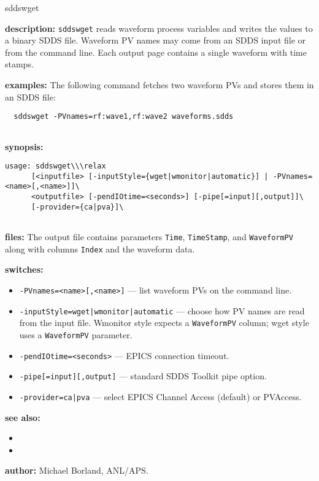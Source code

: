 \begin{sddsprog}{sddswget}
\item \textbf{description:}
  \verb+sddswget+ reads waveform process variables and writes the values to a binary SDDS file.  Waveform PV names may come from an SDDS input file or from the command line.  Each output page contains a single waveform with time stamps.

\item \textbf{examples:}
  The following command fetches two waveform PVs and stores them in an SDDS file:
  \begin{verbatim}
  sddswget -PVnames=rf:wave1,rf:wave2 waveforms.sdds
  
\end{verbatim}

\item \textbf{synopsis:}
  \begin{verbatim}
usage: sddswget\\\relax
      [<inputfile> [-inputStyle={wget|wmonitor|automatic}] | -PVnames=<name>[,<name>]]\
      <outputfile> [-pendIOtime=<seconds>] [-pipe[=input][,output]]\
      [-provider={ca|pva}]\
  
\end{verbatim}

\item \textbf{files:}
  The output file contains parameters \verb+Time+, \verb+TimeStamp+, and \verb+WaveformPV+ along with columns \verb+Index+ and the waveform data.

\item \textbf{switches:}
\begin{itemize}
  \item {\tt -PVnames=<name>[,<name>]} --- list waveform PVs on the command line.
  \item {\tt -inputStyle={wget|wmonitor|automatic}} --- choose how PV names are read from the input file.  Wmonitor style expects a \verb+WaveformPV+ column; wget style uses a \verb+WaveformPV+ parameter.
  \item {\tt -pendIOtime=<seconds>} --- EPICS connection timeout.
  \item {\tt -pipe[=input][,output]} --- standard SDDS Toolkit pipe option.
  \item {\tt -provider={ca|pva}} --- select EPICS Channel Access (default) or PVAccess.
\end{itemize}

\item \textbf{see also:}
\begin{itemize}
  \item {}
  \item {}
\end{itemize}

\item \textbf{author:} Michael Borland, ANL/APS.
\end{sddsprog}
